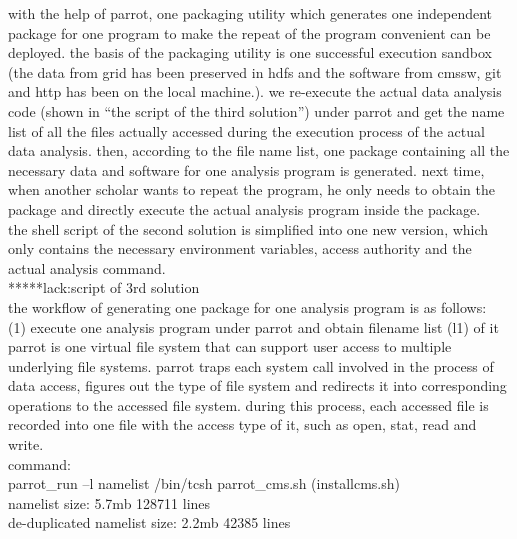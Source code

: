 \documentclass{article}
\begin{document}
with the help of parrot, one packaging utility which generates one independent package for one program to make the repeat of the program convenient can be deployed. the basis of the packaging utility is one successful execution sandbox (the data from grid has been preserved in hdfs and the software from cmssw, git and http has been on the local machine.). we re-execute the actual data analysis code (shown in “the script of the third solution”) under parrot and get the name list of all the files actually accessed during the execution process of the actual data analysis. then, according to the file name list, one package containing all the necessary data and software for one analysis program is generated. next time, when another scholar wants to repeat the program, he only needs to obtain the package and directly execute the actual analysis program inside the package.\\

the shell script of the second solution is simplified into one new version, which only contains the necessary environment variables, access authority and the actual analysis command.\\

*****lack:script of 3rd solution\\

the workflow of generating one package for one analysis program  is as follows: \\
(1) execute one analysis program under parrot and obtain filename list (l1) of it\\
parrot is one virtual file system that can support user access to multiple underlying file systems. parrot traps each system call involved in the process of data access, figures out the type of file system and redirects it into corresponding operations to the accessed file system. during this process, each accessed file is recorded into one file with the access type of it, such as open, stat, read and write.\\
command:\\
parrot\_run –l namelist /bin/tcsh parrot\_cms.sh (installcms.sh)\\
namelist size: 5.7mb     128711 lines\\
de-duplicated namelist size: 2.2mb   42385 lines\\
\end{document}
